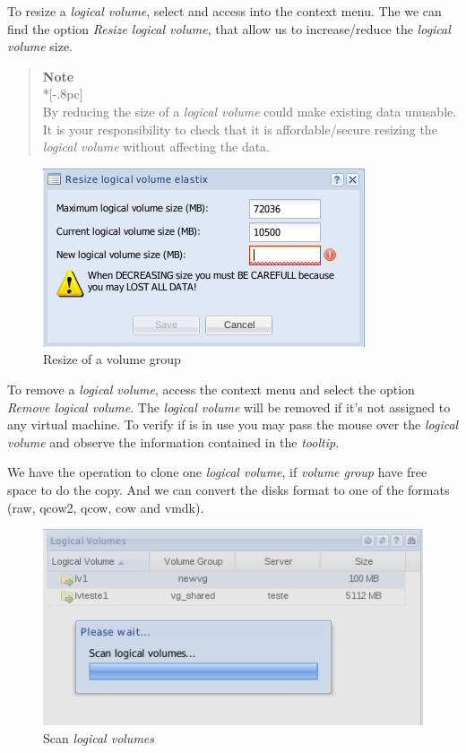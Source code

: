 To resize a \emph{logical volume}, select and access into the context menu. The we can find the option \emph{Resize logical volume}, that allow us to increase/reduce the \emph{logical volume} size.

\begin{quote}
	{\large \bf Note} \\*[-.8pc]
	\underline{\hspace{6in}} \\
    By reducing the size of a \emph{logical volume} could make existing data unusable. It is your responsibility to check that it is affordable/secure resizing the \emph{logical volume} without affecting the data.
\end{quote}


\begin{figure}[H]
        \begin{center}
        \includegraphics[scale=0.5]{screenshots/storage_lv_resize.png}
        \caption{Resize of a volume group}
        \label{fig:storage_lv_resize}
        \end{center}
\end{figure}

To remove a \emph{logical volume}, access the context menu and select the option \emph{Remove logical volume}. The \emph{logical volume} will be removed if it's not assigned to any virtual machine. To verify if is in use you may pass the mouse over the \emph{logical volume} and observe the information contained in the \emph{tooltip}.

We have the operation to clone one \emph{logical volume}, if \emph{volume group} have free space to do the copy.
And we can convert the disks format to one of the formats (raw, qcow2, qcow, cow and vmdk).

\begin{figure}[H]
        \begin{center}
        \includegraphics[scale=0.45]{screenshots/node_storage_lv_search.png}
        \caption{Scan \emph{logical volumes}}
        \label{fig:storage_lv_search}
        \end{center}
\end{figure}

